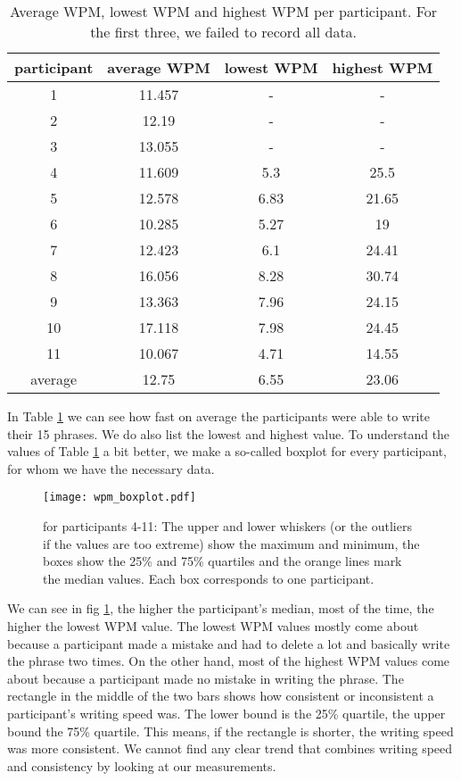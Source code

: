 \begin{table}[ht!]
    \centering
    \caption{Average WPM, lowest WPM and highest WPM per participant. For the first three, we failed to record all data.}
    \begin{tabular}{cccc} \toprule
        participant&average WPM&lowest WPM&highest WPM\\ \midrule
        1 & 11.457 & - & -\\ 
        2 & 12.19 & - & -\\
        3 & 13.055 & - & -\\ 
        4 & 11.609 & 5.3 & 25.5\\
        5 & 12.578 & 6.83 & 21.65\\
        6 & 10.285 & 5.27 & 19\\
        7 & 12.423 & 6.1 & 24.41\\
        8 & 16.056 & 8.28 & 30.74\\
        9 & 13.363 & 7.96 & 24.15\\
        10 & 17.118 & 7.98 & 24.45\\
        11 & 10.067 & 4.71 & 14.55\\
        \bottomrule
        average&12.75&6.55&23.06\\
        \bottomrule
    \end{tabular}
    \label{tab:WPM}
\end{table}
In Table \ref{tab:WPM} we can see how fast on average the participants were able to write their 15 phrases. We do also list the lowest and highest value. To understand the values of Table \ref{tab:WPM} a bit better, we make a so-called boxplot for every participant, for whom we have the necessary data.
\begin{figure}[H]
    \centering
    \texttt{[image: wpm\_boxplot.pdf]}
    \caption{for participants 4-11: The upper and lower whiskers (or the outliers if the values are too extreme) show the maximum and minimum, the boxes show the 25\% and 75\% quartiles and the orange lines mark the median values. Each box corresponds to one participant.}
    \label{fig:WPM}
\end{figure}
We can see in fig \ref{fig:WPM}, the higher the participant's median, most of the time, the higher the lowest WPM value. The lowest WPM values mostly come about because a participant made a mistake and had to delete a lot and basically write the phrase two times. On the other hand, most of the highest WPM values come about because a participant made no mistake in writing the phrase. The rectangle in the middle of the two bars shows how consistent or inconsistent a participant's writing speed was. The lower bound is the 25\% quartile, the upper bound the 75\% quartile. This means, if the rectangle is shorter, the writing speed was more consistent. We cannot find any clear trend that combines writing speed and consistency by looking at our measurements.\\
